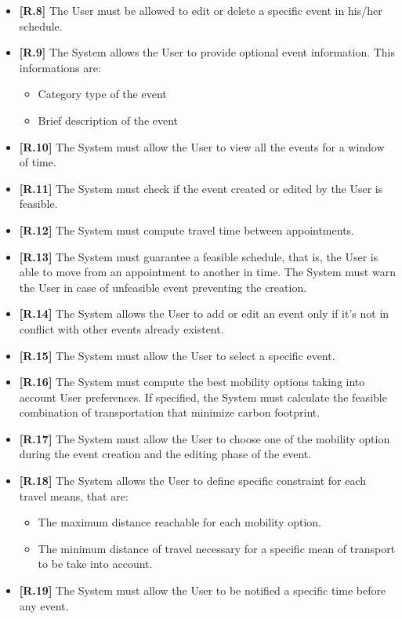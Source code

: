 \begin{itemize}
	\item \textbf{[R.8]} The User must be allowed to edit or delete a specific event in his/her schedule.
	\item \textbf{[R.9]} The System allows the User to provide optional event information. This informations are:
	\begin{itemize}
		\item Category type of the event
		\item Brief description of the event
	\end{itemize}
	\item \textbf{[R.10]} The System must allow the User to view all the events for a window of time.
	\item \textbf{[R.11]} The System must check if the event created or edited by the User is feasible.
	\item \textbf{[R.12]} The System must compute travel time between appointments.
	\item \textbf{[R.13]} The System must guarantee a feasible schedule, that is, the User is able to move from an appointment to another in time. The System must warn the User in case of unfeasible event preventing the creation. 
	\item \textbf{[R.14]} The System allows the User to add or edit an event only if it's not in conflict with other events already existent.
	\item \textbf{[R.15]} The System must allow the User to select a specific event.
	\item \textbf{[R.16]} The System must compute the best mobility options taking into account User preferences. If specified, the System must calculate the feasible combination of transportation that minimize carbon footprint.
	\item  \textbf{[R.17]} The System must allow the User to choose one of the mobility option during the event creation and the editing phase of the event.
	\item \textbf{[R.18]} The System allows the User to define specific constraint for each travel means, that are:
	\begin{itemize}
		\item The maximum distance reachable for each mobility option.
		\item The minimum distance of travel necessary for a specific mean of transport to be take into account.
	\end{itemize} 
	\item \textbf{[R.19]} The System must allow the User to be notified a specific time before any event.

\end{itemize}
